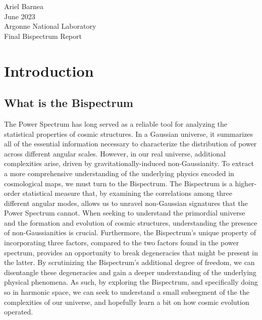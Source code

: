 \documentclass[11pt]{article}
\renewcommand{\_}[1]{\underline{ #1 }}
\newcommand{\npar}{\vspace{.3cm}\newline}
\newcommand{\head}[1]{
	\begin{center}
		{\large #1}
		\vspace{.2 in}
	\end{center}
}
\begin{document}
\head
{Ariel Barnea\\June 2023\\Argonne National Laboratory\\Final Bispectrum Report}

\vspace{-1cm}
\hypersetup{linkcolor=black}
\renewcommand\contentsname{Table of Contents}
\tableofcontents
\newpage

\hypersetup{linkcolor=blue}

{\setlength{\parindent}{0cm}

\section{Introduction}\label{intro}

\subsection{What is the Bispectrum}

The Power Spectrum has long served as a reliable tool for analyzing the statistical properties of cosmic structures. In a Gaussian universe, it summarizes all of the essential information necessary to characterize the distribution of power across different angular scales. However, in our real universe, additional complexities arise, driven by gravitationally-induced non-Gaussianity. To extract a more comprehensive understanding of the underlying physics encoded in cosmological maps, we must turn to the Bispectrum.
\npar
The Bispectrum is a higher-order statistical measure that, by examining the correlations among three different angular modes, allows us to unravel non-Gaussian signatures that the Power Spectrum cannot. When seeking to understand the primordial universe and the formation and evolution of cosmic structures, understanding the presence of non-Gaussianities is crucial. Furthermore, the Bispectrum's unique property of incorporating three factors, compared to the two factors found in the power spectrum, provides an opportunity to break degeneracies that might be present in the latter. By scrutinizing the Bispectrum's additional degree of freedom, we can disentangle these degeneracies and gain a deeper understanding of the underlying physical phenomena.
\npar
As such, by exploring the Bispectrum, and specifically doing so in harmonic space, we can seek to understand a small subsegment of the the complexities of our universe, and hopefully learn a bit on how cosmic evolution operated.

}
\end{document}
